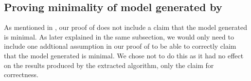 \subsection{Proving minimality of model generated by }

As mentioned in , our proof of  does not include a claim that the model
generated is minimal. As later explained in the same subsection, we would only need to include one addtional
assumption in our proof of  to be able to correctly claim that the model generated is minimal.
We chose not to do this as it had no effect on the results produced by the extracted algorithm,
only the claim for correctness.
